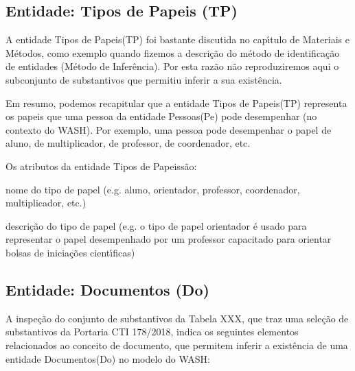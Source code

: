 \documentclass[
12pt,		%
openright,	%
twoside,  %
a4paper,			%
chapter=TITLE,		%
english,			%
french,				%
spanish,			%
brazil				%
]{USPSC-classe/USPSC}
\begin{document}
\subsection[Entidade: Tipos de Papeis (TP)]{Entidade: Tipos de Papeis (TP)}\label{Entidade: Tipos de Papeis (TP)}
A entidade \textquotedbl Tipos de Papeis\textquotedbl  (TP) foi bastante discutida no cap\'{\i}tulo de Materiais e M\'etodos, como exemplo quando fizemos a descri\c{c}\~ao do m\'etodo de identifica\c{c}\~ao de entidades (\textquotedbl M\'etodo de Infer\^encia\textquotedbl ). Por esta raz\~ao n\~ao reproduziremos aqui o subconjunto de substantivos que permitiu inferir a sua exist\^encia.










Em resumo, podemos recapitular que a entidade \textquotedbl Tipos de Papeis\textquotedbl  (TP) representa os papeis que uma pessoa da entidade \textquotedbl Pessoas\textquotedbl  (Pe) pode desempenhar (no contexto do WASH). Por exemplo, uma pessoa pode desempenhar o papel de aluno, de multiplicador, de professor, de coordenador, etc.










Os atributos da entidade \textquotedbl Tipos de Papeis\textquotedbl  s\~ao:











\begin{alineas}
\item nome do tipo de papel (e.g. aluno, orientador, professor, coordenador, multiplicador, etc.)
\item descri\c{c}\~ao do tipo de papel (e.g. \textquotedbl o tipo de papel orientador \'e usado para representar o papel desempenhado por um professor capacitado para orientar bolsas de inicia\c{c}\~oes cient\'{\i}ficas\textquotedbl )
\end{alineas}

\subsection[Entidade: Documentos (Do)]{Entidade: Documentos (Do)}\label{Entidade: Documentos (Do)}
A inspe\c{c}\~ao do conjunto de substantivos da Tabela XXX, que traz uma sele\c{c}\~ao de substantivos da Portaria CTI 178/2018, indica os seguintes elementos relacionados ao conceito de \textquotedbl documento\textquotedbl , que permitem inferir a exist\^encia de uma entidade \textquotedbl Documentos\textquotedbl  (Do) no modelo do WASH:
\end{document}

